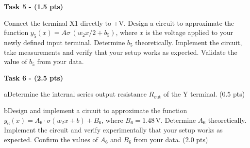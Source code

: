 \textbf{Task 5 - (1.5 pts)}

Connect the terminal X1 directly to +V. Design a circuit to approximate the
function $y_5(x) = A\sigma\,(w_2x/2 + b_5)$, where $x$ is the voltage applied
to your newly defined input terminal. Determine $b_5$ theoretically. Implement
the circuit, take measurements and verify that your setup works as expected.
Validate the value of $b_5$ from your data.

\textbf{Task 6 - (2.5 pts)}

a\quad Determine the internal series output resistance $R_\mathrm{out}$ of the
Y terminal. (0.5 pts)

b\quad Design and implement a circuit to approximate the function
$y_6(x) = A_6 \cdot \sigma(w_2x + b) + B_6$, where
$B_6 = 1.48\,\mathrm{V}$. Determine $A_6$ theoretically. Implement the circuit
and verify experimentally that your setup works as expected. Confirm the
values of $A_6$ and $B_6$ from your data. (2.0 pts)
